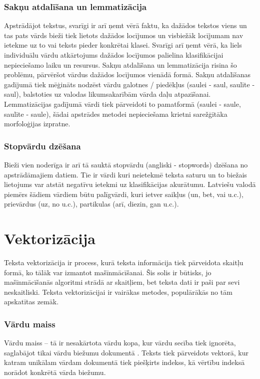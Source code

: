 \subsubsection{Sakņu atdalīšana un lemmatizācija}
Apstrādājot tekstus, svarīgi ir arī ņemt vērā faktu, ka dažādos tekstos viens un tas pats vārds bieži tiek lietots dažādos locījumos un visbiežāk locījumam nav ietekme uz to vai teksts pieder konkrētai klasei. Svarīgi arī ņemt vērā, ka liels individuālu vārdu atkārtojums dažādos locījumos palielina klasifikācijai nepieciešamo laiku un resursus. Sakņu atdalīšana un lemmatizācija risina šo problēmu, pārvēršot vārdus dažādos locījumos vienādā formā. Sakņu atdalīšanas gadījumā tiek mēģināts nodzēst vārdu galotnes / piedēkļus (saulei - saul, saulīte - saul), balstoties uz valodas likumsakarībām vārda daļu atpazīšanai. Lemmatizācijas gadījumā vārdi tiek pārveidoti to pamatformā (saulei - saule, saulīte - saule), šādai apstrādes metodei nepieciešama krietni sarežģītāka morfoloģijas izpratne.

\subsubsection{Stopvārdu dzēšana}
Bieži vien noderīga ir arī tā sauktā stopvārdu (angliski - stopwords) dzēšana no apstrādāmajiem datiem. Tie ir vārdi kuri neietekmē teksta saturu un to biežais lietojums var atstāt negatīvu ietekmi uz klasifikācijas akurātumu. Latviešu valodā piemērs šādiem vārdiem būtu palīgvārdi, kuri ietver saikļus (un, bet, vai u.c.), prievārdus (uz, no u.c.), partikulas (arī, diezin, gan u.c.).

\section{Vektorizācija}
Teksta vektorizācija ir process, kurā teksta informācija tiek pārveidota skaitļu formā, ko tālāk var izmantot mašīnmācīšanai. Šis solis ir būtisks, jo mašīnmācīšanās algoritmi strādā ar skaitļiem, bet teksta dati ir paši par sevi neskaitliski. Teksta vektorizācijai ir vairākas metodes, populārākās no tām apskatītas zemāk.

\subsubsection{Vārdu maiss}
Vārdu maiss – tā ir nesakārtota vārdu kopa, kur vārdu secība tiek ignorēta, saglabājot tikai vārdu biežumu dokumentā \cite{speechandlanguageproc}. Teksts tiek pārveidots vektorā, kur katram unikālam vārdam dokumentā tiek piešķirts indekss, kā vērtību indeksā norādot konkrētā vārda biežumu. 

